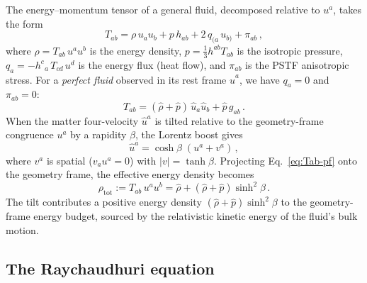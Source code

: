 The energy--momentum tensor of a general fluid, decomposed
relative to $u^a$, takes the form
\begin{equation}\label{eq:Tab-general}
T_{ab} = \rho\, u_a u_b + p\, h_{ab}
  + 2\,q_{(a}\,u_{b)} + \pi_{ab}\,,
\end{equation}
where
$\rho = T_{ab}\,u^a u^b$ is the energy density,
$p = \frac{1}{3} h^{ab} T_{ab}$ is the isotropic pressure,
$q_a = -h^c{}_a\,T_{cd}\,u^d$ is the energy flux (heat flow),
and $\pi_{ab}$ is the PSTF anisotropic stress.
For a \emph{perfect fluid} observed in its rest frame
$\hat{u}^a$, we have $q_a = 0$ and $\pi_{ab} = 0$:
\begin{equation}\label{eq:Tab-pf}
T_{ab} = (\hat{\rho} + \hat{p})\,\hat{u}_a\hat{u}_b
       + \hat{p}\,g_{ab}\,.
\end{equation}
When the matter four-velocity $\hat{u}^a$ is tilted relative
to the geometry-frame congruence $u^a$ by a rapidity $\beta$,
the Lorentz boost gives
\begin{equation}\label{eq:boost-u}
\hat{u}^a = \cosh\beta\;(u^a + v^a)\,,
\end{equation}
where $v^a$ is spatial ($v_a u^a = 0$) with
$|v| = \tanh\beta$.  Projecting Eq.~\eqref{eq:Tab-pf} onto
the geometry frame, the effective energy density becomes
\begin{equation}\label{eq:rho-geom}
\rho_{\mathrm{tot}} := T_{ab}\,u^a u^b
= \hat{\rho} + (\hat{\rho} + \hat{p})\sinh^2\!\beta\,.
\end{equation}
The tilt contributes a positive energy density
$(\hat{\rho} + \hat{p})\sinh^2\!\beta$ to the geometry-frame
energy budget, sourced by the relativistic kinetic energy of
the fluid's bulk motion.


\subsection{The Raychaudhuri equation}\label{sec:raychaudhuri}

